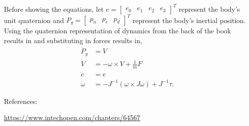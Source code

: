 \documentclass[11pt]{article}
\newcommand{\mathse}[1]{\begin{gather*}#1\end{gather*}}
\newcommand{\mat}[1]{\begin{bmatrix} #1 \end{bmatrix}}
\newcommand{\sinput}[1]{}
\begin{document}
Before showing the equations, let $e = \mat{e_0 & e_1 & e_2 & e_3}^T$ represent the body's unit quaternion and $P_g = \mat{p_n & p_e & p_d}^T$ represent the body's inertial position.
Using the quaternion representation of dynamics from the back of the book results in and substituting in forces results in,
\begin{align*}
    \dot{P}_g &= \sinput{M1}V\\
    \dot{V} &= -\omega\times V  + \frac{1}{m}F\\
    \dot{e} &= \sinput{M3}e\\
    \dot{\omega} &= -J^{-1}\left(\omega\times J\omega\right) + J^{-1}\tau.
\end{align*}




\newpage
\begin{center}
    References:
\end{center}
\url{https://www.intechopen.com/chapters/64567}
\end{document}
